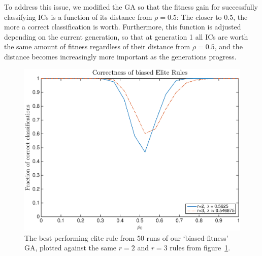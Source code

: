 To address this issue, we modified the GA so that the fitness gain for successfully classifying ICs is a function of its distance from $\rho = 0.5$: The 
closer to 0.5, the more a correct classification is worth. Furthermore, this function is adjusted depending on the current generation, so that at generation 1 
all ICs are worth the same amount of fitness regardless of their distance from $\rho = 0.5$, and the distance becomes increasingly more important as 
the generations progress.

\begin{figure}
\begin{center}
\includegraphics[width=\linewidth]{figures/lambda_biased_correctness_plot.eps}
\caption{The best performing elite rule from 50 runs of our `biased-fitness' GA, plotted against the same $r = 2$ and $r = 3$ rules from 
figure~\ref{fig:r2_r3_rho}.}
\label{fig:r2_r3_rho}
\end{center}
\end{figure}


